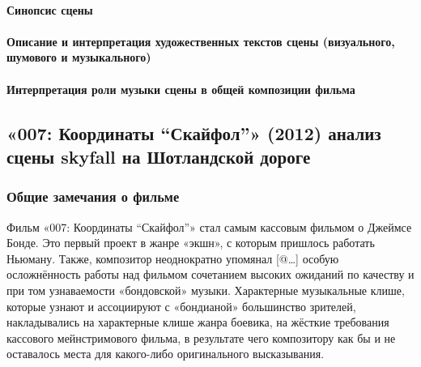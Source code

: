 \paragraph{Синопсис сцены}\label{ux441ux438ux43dux43eux43fux441ux438ux441-ux441ux446ux435ux43dux44b-6}

\paragraph{Описание и интерпретация художественных текстов сцены (визуального, шумового и музыкального)}\label{ux43eux43fux438ux441ux430ux43dux438ux435-ux438-ux438ux43dux442ux435ux440ux43fux440ux435ux442ux430ux446ux438ux44f-ux445ux443ux434ux43eux436ux435ux441ux442ux432ux435ux43dux43dux44bux445-ux442ux435ux43aux441ux442ux43eux432-ux441ux446ux435ux43dux44b-ux432ux438ux437ux443ux430ux43bux44cux43dux43eux433ux43e-ux448ux443ux43cux43eux432ux43eux433ux43e-ux438-ux43cux443ux437ux44bux43aux430ux43bux44cux43dux43eux433ux43e-5}

\paragraph{Интерпретация роли музыки сцены в общей композиции фильма}\label{ux438ux43dux442ux435ux440ux43fux440ux435ux442ux430ux446ux438ux44f-ux440ux43eux43bux438-ux43cux443ux437ux44bux43aux438-ux441ux446ux435ux43dux44b-ux432-ux43eux431ux449ux435ux439-ux43aux43eux43cux43fux43eux437ux438ux446ux438ux438-ux444ux438ux43bux44cux43cux430-4}

\subsection{\texorpdfstring{«007: Координаты ``Скайфол''» (2012) анализ сцены skyfall на Шотландской дороге}{«007: Координаты Скайфол» (2012) анализ сцены skyfall на Шотландской дороге}}\label{sec.SmEt.JB}

\subsubsection{Общие замечания о фильме}\label{ux43eux431ux449ux438ux435-ux437ux430ux43cux435ux447ux430ux43dux438ux44f-ux43e-ux444ux438ux43bux44cux43cux435-5}

Фильм «007: Координаты ``Скайфол''» стал самым кассовым фильмом о Джеймсе Бонде.
Это первый проект в жанре «экшн», с которым пришлось работать Ньюману.
Также, композитор неоднократно упомянал {[}@\ldots{}{]} особую осложнённость работы над фильмом сочетанием высоких ожиданий по качеству и при том узнаваемости «бондовской» музыки.
Характерные музыкальные клише, которые узнают и ассоциируют с «бондианой» большинство зрителей, накладывались на характерные клише жанра боевика, на жёсткие требования кассового мейнстримового фильма, в результате чего композитору как бы и не оставалось места для какого-либо оригинального высказывания.

